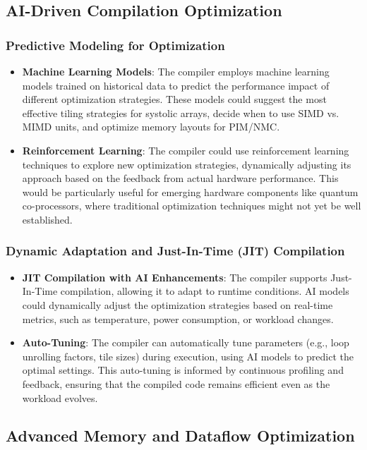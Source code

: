 \documentclass{article}
\begin{document}
\subsection{AI-Driven Compilation Optimization}

\subsubsection{Predictive Modeling for Optimization}
\begin{itemize}
    \item \textbf{Machine Learning Models}: The compiler employs machine learning models trained on historical data to predict the performance impact of different optimization strategies. These models could suggest the most effective tiling strategies for systolic arrays, decide when to use SIMD vs. MIMD units, and optimize memory layouts for PIM/NMC.
    \item \textbf{Reinforcement Learning}: The compiler could use reinforcement learning techniques to explore new optimization strategies, dynamically adjusting its approach based on the feedback from actual hardware performance. This would be particularly useful for emerging hardware components like quantum co-processors, where traditional optimization techniques might not yet be well established.
\end{itemize}

\subsubsection{Dynamic Adaptation and Just-In-Time (JIT) Compilation}
\begin{itemize}
    \item \textbf{JIT Compilation with AI Enhancements}: The compiler supports Just-In-Time compilation, allowing it to adapt to runtime conditions. AI models could dynamically adjust the optimization strategies based on real-time metrics, such as temperature, power consumption, or workload changes.
    \item \textbf{Auto-Tuning}: The compiler can automatically tune parameters (e.g., loop unrolling factors, tile sizes) during execution, using AI models to predict the optimal settings. This auto-tuning is informed by continuous profiling and feedback, ensuring that the compiled code remains efficient even as the workload evolves.
\end{itemize}

\subsection{Advanced Memory and Dataflow Optimization}
\end{document}
